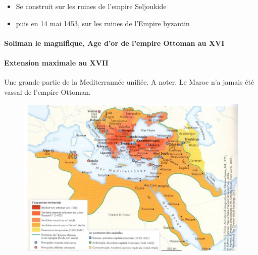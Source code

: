 \begin{itemize}
    \item Se construit sur les ruines de l'empire Seljoukide
    \item puis en 14 mai 1453, sur les ruines de l'Empire byzantin
\end{itemize}

\paragraph{Soliman le magnifique, Age d'or de l'empire Ottoman au XVI}
\paragraph{Extension maximale au XVII} Une grande partie de la Mediterrannée unifiée.
A noter, Le Maroc n'a jamais été vassal de l'empire Ottoman. 
\begin{figure}[h!]
    \centering
    \includegraphics[width=\textwidth]{HistoireIslamMediterranee/Images/ExpansionEmpireOttoman.jpg}

    \label{fig:my_label}
\end{figure}

